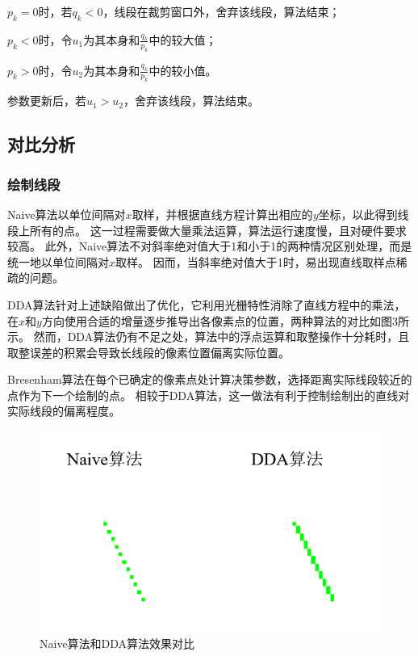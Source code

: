 \documentclass[a4paper,UTF8]{article}
\begin{document}
$p_k=0$时，若$q_k<0$，线段在裁剪窗口外，舍弃该线段，算法结束；

$p_k<0$时，令$u_1$为其本身和$\frac{q_k}{p_k}$中的较大值；

$p_k>0$时，令$u_2$为其本身和$\frac{q_k}{p_k}$中的较小值。

参数更新后，若$u_1>u_2$，舍弃该线段，算法结束。


        
\subsection{对比分析}
\subsubsection{绘制线段}
Naive算法以单位间隔对$x$取样，并根据直线方程计算出相应的$y$坐标，以此得到线段上所有的点。
这一过程需要做大量乘法运算，算法运行速度慢，且对硬件要求较高。
此外，Naive算法不对斜率绝对值大于1和小于1的两种情况区别处理，而是统一地以单位间隔对$x$取样。
因而，当斜率绝对值大于1时，易出现直线取样点稀疏的问题。

DDA算法针对上述缺陷做出了优化，它利用光栅特性消除了直线方程中的乘法，在$x$和$y$方向使用合适的增量逐步推导出各像素点的位置，两种算法的对比如图3所示。
然而，DDA算法仍有不足之处，算法中的浮点运算和取整操作十分耗时，且取整误差的积累会导致长线段的像素位置偏离实际位置。

Bresenham算法在每个已确定的像素点处计算决策参数，选择距离实际线段较近的点作为下一个绘制的点。
相较于DDA算法，这一做法有利于控制绘制出的直线对实际线段的偏离程度。

\begin{figure}[H]
    \centering
    \includegraphics[scale=0.6]{naive-vs-dda.PNG}
    \caption{Naive算法和DDA算法效果对比}
\end{figure}
\end{document}
